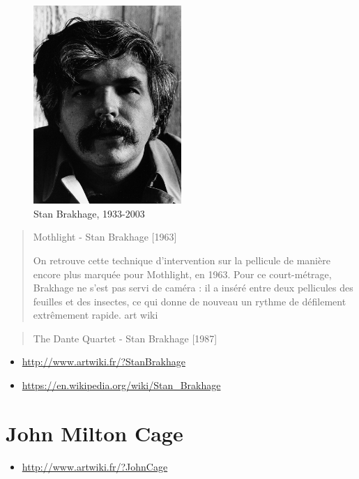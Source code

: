 \documentclass[
  french,
]{book}
\providecommand{\tightlist}{%
  \setlength{\itemsep}{0pt}\setlength{\parskip}{0pt}}
\begin{document}
\begin{figure}
\centering
\includegraphics[width=0.5\textwidth,height=\textheight]{medias/corpus/brakhage/Stan_Brakhage_(circa_1976).jpg}
\caption{Stan Brakhage, 1933-2003}
\end{figure}

\begin{quote}
Mothlight - Stan Brakhage {[}1963{]}

On retrouve cette technique d'intervention sur la pellicule de manière encore plus marquée pour Mothlight, en 1963. Pour ce court-métrage, Brakhage ne s'est pas servi de caméra : il a inséré entre deux pellicules des feuilles et des insectes, ce qui donne de nouveau un rythme de défilement extrêmement rapide.
art wiki
\end{quote}

\begin{quote}
The Dante Quartet - Stan Brakhage {[}1987{]}
\end{quote}

\begin{itemize}
\tightlist
\item
  \url{http://www.artwiki.fr/?StanBrakhage}
\item
  \url{https://en.wikipedia.org/wiki/Stan_Brakhage}
\end{itemize}

\hypertarget{john-milton-cage}{%
\section{John Milton Cage}\label{john-milton-cage}}

\begin{itemize}
\tightlist
\item
  \url{http://www.artwiki.fr/?JohnCage}
\end{itemize}
\end{document}

